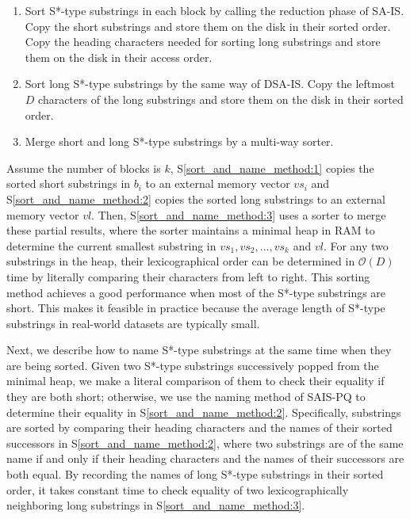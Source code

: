 \documentclass[10pt,journal,compsoc]{IEEEtran}
\begin{document}
\begin{enumerate}[S1]
	\item Sort S*-type substrings in each block by calling the reduction phase of SA-IS. Copy the short substrings and store them on the disk in their sorted order. Copy the heading characters needed for sorting long substrings and store them on the disk in their access order.~\label{sort_and_name_method:1}
	
	\item Sort long S*-type substrings by the same way of DSA-IS. Copy the leftmost $D$ characters of the long substrings and store them on the disk in their sorted order.~\label{sort_and_name_method:2}
	
	\item Merge short and long S*-type substrings by a multi-way sorter.~\label{sort_and_name_method:3}
\end{enumerate}

Assume the number of blocks is $k$, S\ref{sort_and_name_method:1} copies the sorted short substrings in $b_i$ to an external memory vector $vs_i$ and S\ref{sort_and_name_method:2} copies the sorted long substrings to an external memory vector $vl$. Then, S\ref{sort_and_name_method:3} uses a sorter to merge these partial results, where the sorter maintains a minimal heap in RAM to determine the current smallest substring in $vs_1, vs_2, ..., vs_k$ and $vl$. For any two substrings in the heap, their lexicographical order can be determined in $\mathcal{O}(D)$ time by literally comparing their characters from left to right. This sorting method achieves a good performance when most of the S*-type substrings are short. This makes it feasible in practice because the average length of S*-type substrings in real-world datasets are typically small.

Next, we describe how to name S*-type substrings at the same time when they are being sorted. Given two S*-type substrings successively popped from the minimal heap, we make a literal comparison of them to check their equality if they are both short; otherwise, we use the naming method of SAIS-PQ to determine their equality in S\ref{sort_and_name_method:2}. Specifically,
substrings are sorted by comparing their heading characters and the names of their sorted successors in S\ref{sort_and_name_method:2}, where two substrings are of the same name if and only if their heading characters and the names of their successors are both equal. By recording the names of long S*-type substrings in their sorted order, it takes constant time to check equality of two lexicographically neighboring long substrings in S\ref{sort_and_name_method:3}.
\end{document}
